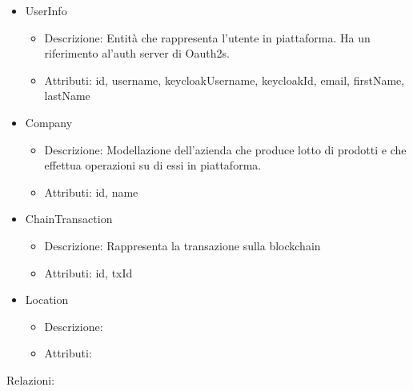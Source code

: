 \documentclass[a4paper,11pt]{article}
\begin{document}
\begin{itemize}
\begin{itemize}
        \end{itemize}
  \item UserInfo
        \begin{itemize}
          \item Descrizione: Entità che rappresenta l'utente in piattaforma. Ha un riferimento al'auth server di Oauth2s.
          \item Attributi: id, username, keycloakUsername, keycloakId, email, firstName, lastName
        \end{itemize}
  \item Company
        \begin{itemize}
          \item Descrizione: Modellazione dell'azienda che produce lotto di prodotti e che effettua operazioni su di essi in piattaforma.
          \item Attributi: id, name
        \end{itemize}
  \item ChainTransaction
        \begin{itemize}
          \item Descrizione: Rappresenta la transazione sulla blockchain
          \item Attributi: id, txId
        \end{itemize}
  \item Location
        \begin{itemize}
          \item Descrizione:
          \item Attributi:
        \end{itemize}
\end{itemize}

Relazioni:
\end{document}
